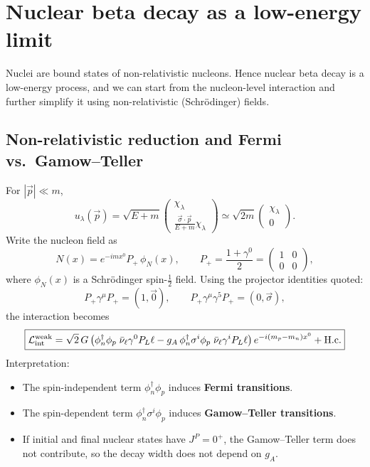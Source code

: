 \section{Nuclear beta decay as a low-energy limit}
Nuclei are bound states of non-relativistic nucleons. Hence nuclear beta decay is a
low-energy process, and we can start from the nucleon-level interaction and further
simplify it using non-relativistic (Schr\"odinger) fields.

\subsection{Non-relativistic reduction and Fermi vs.\ Gamow--Teller}
For $|\vec p|\ll m$,
\begin{equation}
u_\lambda(\vec p)=\sqrt{E+m}
\begin{pmatrix}
\chi_\lambda\\
\frac{\vec\sigma\cdot\vec p}{E+m}\chi_\lambda
\end{pmatrix}
\simeq
\sqrt{2m}
\begin{pmatrix}
\chi_\lambda\\
0
\end{pmatrix}.
\end{equation}
Write the nucleon field as
\begin{equation}
N(x)=e^{-imx^0}P_+\,\phi_N(x),
\qquad
P_+=\frac{1+\gamma^0}{2}=
\begin{pmatrix}
1&0\\
0&0
\end{pmatrix},
\end{equation}
where $\phi_N(x)$ is a Schr\"odinger spin-$\tfrac12$ field. Using the projector identities quoted:
\begin{equation}
P_+\gamma^\mu P_+=(1,\vec 0),
\qquad
P_+\gamma^\mu\gamma^5 P_+=(0,\vec\sigma),
\end{equation}
the interaction becomes
\begin{equation}
\boxed{
\mathcal{L}^{\rm weak}_{\rm int}
=
\sqrt{2}\,G\left(
\phi_n^\dagger \phi_p\;\bar\nu_\ell\gamma^0 P_L \ell
- g_A\,\phi_n^\dagger\sigma^i\phi_p\;\bar\nu_\ell\gamma^i P_L \ell
\right)e^{-i(m_p-m_n)x^0}
+\text{H.c.}
}
\end{equation}
Interpretation:
\begin{itemize}
  \item The spin-independent term $\phi_n^\dagger\phi_p$ induces \textbf{Fermi transitions}.
  \item The spin-dependent term $\phi_n^\dagger\sigma^i\phi_p$ induces \textbf{Gamow--Teller transitions}.
  \item If initial and final nuclear states have $J^P=0^+$, the Gamow--Teller term does not contribute,
        so the decay width does not depend on $g_A$.
\end{itemize}

